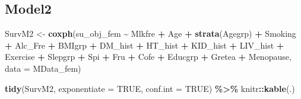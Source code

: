 \documentclass[
]{article}
\newenvironment{Shaded}{\begin{snugshade}}{\end{snugshade}}
\newcommand{\DataTypeTok}[1]{\textcolor[rgb]{0.13,0.29,0.53}{#1}}
\newcommand{\KeywordTok}[1]{\textcolor[rgb]{0.13,0.29,0.53}{\textbf{#1}}}
\newcommand{\NormalTok}[1]{#1}
\newcommand{\OperatorTok}[1]{\textcolor[rgb]{0.81,0.36,0.00}{\textbf{#1}}}
\newcommand{\OtherTok}[1]{\textcolor[rgb]{0.56,0.35,0.01}{#1}}
\newcommand{\StringTok}[1]{\textcolor[rgb]{0.31,0.60,0.02}{#1}}
\begin{document}
\hypertarget{model2-10}{%
\subsection{Model2}\label{model2-10}}

\begin{Shaded}
\begin{Highlighting}[]
\NormalTok{SurvM2 \textless{}{-}}\StringTok{  }\KeywordTok{coxph}\NormalTok{(su\_obj\_fem }\OperatorTok{\textasciitilde{}}\StringTok{ }\NormalTok{Mlkfre }\OperatorTok{+}\StringTok{ }\NormalTok{Age }\OperatorTok{+}\StringTok{ }\KeywordTok{strata}\NormalTok{(Agegrp) }\OperatorTok{+}\StringTok{ }\NormalTok{Smoking }\OperatorTok{+}\StringTok{ }\NormalTok{Alc\_Fre }\OperatorTok{+}\StringTok{ }
\StringTok{                   }\NormalTok{BMIgrp }\OperatorTok{+}\StringTok{ }\NormalTok{DM\_hist }\OperatorTok{+}\StringTok{ }\NormalTok{HT\_hist }\OperatorTok{+}\StringTok{ }\NormalTok{KID\_hist }\OperatorTok{+}\StringTok{ }\NormalTok{LIV\_hist }\OperatorTok{+}\StringTok{ }\NormalTok{Exercise }\OperatorTok{+}\StringTok{ }
\StringTok{                   }\NormalTok{Slepgrp }\OperatorTok{+}\StringTok{ }\NormalTok{Spi }\OperatorTok{+}\StringTok{ }\NormalTok{Fru }\OperatorTok{+}\StringTok{ }\NormalTok{Cofe }\OperatorTok{+}\StringTok{ }\NormalTok{Educgrp }\OperatorTok{+}\StringTok{ }\NormalTok{Gretea }\OperatorTok{+}\StringTok{ }\NormalTok{Menopause, }
                 \DataTypeTok{data =}\NormalTok{ MData\_fem)}

\KeywordTok{tidy}\NormalTok{(SurvM2, }\DataTypeTok{exponentiate =} \OtherTok{TRUE}\NormalTok{, }\DataTypeTok{conf.int =} \OtherTok{TRUE}\NormalTok{) }\OperatorTok{\%\textgreater{}\%}\StringTok{ }
\StringTok{  }\NormalTok{knitr}\OperatorTok{::}\KeywordTok{kable}\NormalTok{(.)}
\end{Highlighting}
\end{Shaded}
\end{document}
